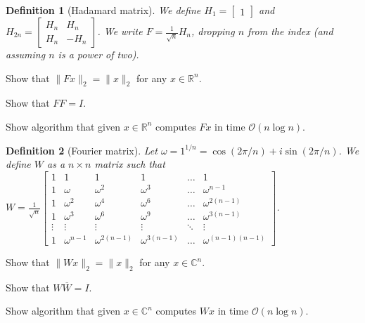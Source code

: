 \documentclass[12pt]{uebung}
\newtheorem{definition}{Definition}
\begin{document}
 

\newcommand{\bigo}{\mathcal{O}}
\renewcommand{\aufgname}{Exercise}

\begin{definition}[Hadamard matrix]
We define $H_1 = \begin{bmatrix} 1 \end{bmatrix}$ and $H_{2n} = \begin{bmatrix} H_n & H_n \\ H_n & -H_n \end{bmatrix}$. We  write $F = \frac{1}{\sqrt{n}} H_n$, dropping $n$ from the index (and assuming $n$ is a power of two).
\end{definition}

\begin{aufg}
Show that $\|F x\|_2 = \|x\|_2$ for any $x \in \mathbb{R}^n$.
\end{aufg}

\begin{aufg}
Show that $FF = I$.
\end{aufg}

\begin{aufg}
Show algorithm that given $x \in \mathbb{R}^n$ computes $Fx$ in time $\bigo(n \log n)$.
\end{aufg}

\vfill

\begin{definition}[Fourier matrix]
Let $\omega = 1^{1/n} = \cos(2\pi/n)+i \sin(2 \pi/n)$. We define $W$ as a $n\times n$ matrix such that 
$W = \frac{1}{\sqrt{n}} \begin{bmatrix} 1 & 1 & 1 & 1 & \hdots & 1\\ 1 & \omega & \omega^2 & \omega^3 & \hdots & \omega^{n-1}\\ 1 & \omega^2 & \omega^4 & \omega^6 & \hdots & \omega^{2(n-1)}\\ 1 & \omega^3 & \omega^6 & \omega^9 & \hdots & \omega^{3(n-1)}\\ \vdots & \vdots & \vdots & \vdots & \ddots & \vdots\\ 1 & \omega^{n-1} & \omega^{2(n-1)} & \omega^{3(n-1)} &  \hdots & \omega^{(n-1)(n-1)} \end{bmatrix}$.
\end{definition}

\begin{aufg}
Show that $\|W x\|_2 = \|x\|_2$ for any $x \in \mathbb{C}^n$.
\end{aufg}

\begin{aufg}
Show that $W \overline{W} = I$.
\end{aufg}

\begin{aufg}
Show algorithm that given $x \in \mathbb{C}^n$ computes $Wx$ in time $\bigo(n \log n)$.
\end{aufg}
\end{document}
